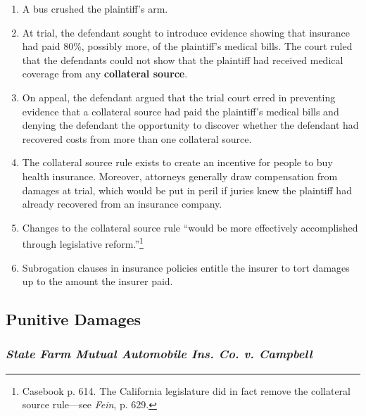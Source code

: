 \begin{enumerate}
    \item A bus crushed the plaintiff's arm.
    \item At trial, the defendant sought to introduce evidence showing that 
    insurance had paid 80\%, possibly more, of the plaintiff's medical bills.  
    The court ruled that the defendants could not show that the plaintiff had 
    received medical coverage from any \textbf{collateral source}.
    \item On appeal, the defendant argued that the trial court erred in 
    preventing evidence that a collateral source had paid the plaintiff's 
    medical bills and denying the defendant the opportunity to discover whether 
    the defendant had recovered costs from more than one collateral source.
    \item The collateral source rule exists to create an incentive for people to 
    buy health insurance. Moreover, attorneys generally draw compensation from 
    damages at trial, which would be put in peril if juries knew the plaintiff 
    had already recovered from an insurance company.
    \item Changes to the collateral source rule ``would be more effectively 
    accomplished through legislative reform.''\footnote{Casebook p. 614. The 
    California legislature did in fact remove the collateral source rule---see 
    \emph{Fein}, p. 629.}
    \item Subrogation clauses in insurance policies entitle the insurer to tort 
    damages up to the amount the insurer paid.
\end{enumerate}

\subsection{Punitive Damages}

\subsubsection{\emph{State Farm Mutual Automobile Ins. Co. v. Campbell}}

